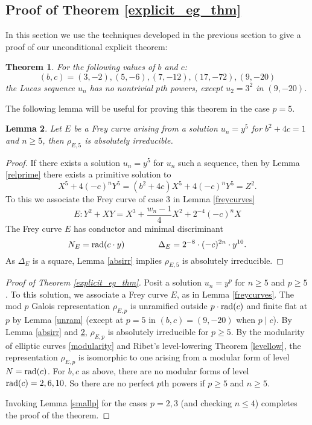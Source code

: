 \documentclass[12pt]{amsart}
\newtheorem{thm}{Theorem}[section]
\newtheorem{lem}[thm]{Lemma}
\theoremstyle{definition}
\theoremstyle{remark}
\newcommand{\rad}{{\rm{rad}}}
\begin{document}
\subsection{Proof of Theorem \ref{explicit_eg_thm}}

In this section we use the techniques developed in the previous section to give a proof of our unconditional explicit theorem:

\begin{thm}\label{explicit_eg_thm_inplace}
For the following values of $b$ and $c$:
\begin{equation}\label{examples} (b,c) = (3,-2), (5,-6), (7,-12), (17,-72), (9,-20) \end{equation}
the Lucas sequence $u_n$ has no nontrivial $p$th powers, except $u_2 = 3^2$ in $(9,-20)$.
\end{thm}

\noindent
The following lemma will be useful for proving this theorem in the case $p=5$.

\begin{lem}\label{frey5irr}
Let $E$ be a Frey curve arising from a solution $u_n = y^5$ for $b^2+4c = 1$ and $n\geq 5$, then $\rho_{E,5}$ is absolutely irreducible.
\end{lem}
\begin{proof}
If there exists a solution $u_n = y^5$ for $u_n$ such a sequence, then by Lemma \ref{relprime} there exists a primitive solution to 
\[ X^5 + 4(-c)^n Y^5 = (b^2 + 4c) X^5 + 4(-c)^n Y^5 = Z^2. \]
To this we associate the Frey curve of case 3 in Lemma \ref{freycurves}
\[E: Y^2 + XY = X^3 + \frac{w_n - 1}{4} X^2 + 2^{-4}(-c)^nX \]
The Frey curve $E$ has conductor and minimal discriminant
\[ N_E =\rad(c \cdot y)  \qquad \qquad \Delta_E = 2^{-8} \cdot (-c)^{2n} \cdot y^{10}. \]
As $\Delta_E$ is a square, Lemma \ref{absirr} implies $\rho_{E,5}$ is absolutely irreducible.
\end{proof}

\begin{proof}[Proof of Theorem \ref{explicit_eg_thm}]
Posit a solution $u_n = y^p$ for $n \geq 5$ and $p \geq 5$.  To this solution, we associate a Frey curve $E$, as in Lemma \ref{freycurves}.  The mod $p$ Galois representation $\rho_{E,p}$ is unramified outside $p\cdot \rad{(c)}$ and finite flat at $p$  by Lemma \ref{unram} (except at $p=5$ in $(b,c) = (9,-20)$ when $p \mid c$).   By Lemma \ref{absirr} and \ref{frey5irr}, $\rho_{E,p}$ is absolutely irreducible for $p\geq 5$.  By the modularity of elliptic curves \ref{modularity} and Ribet's level-lowering Theorem \ref{levellow}, the representation $\rho_{E,p}$ is isomorphic to one arising from a modular form of level $N = \rad(c)$.  For $b,c$ as above, there are no modular forms of level $\rad(c)=2,6,10$.  So there are no perfect $p$th powers if $p \geq 5$ and $n \geq 5$.

Invoking Lemma \ref{smallp} for the cases $p=2,3$ (and checking $n \leq 4$) completes the proof of the theorem.
\end{proof}
\end{document}
